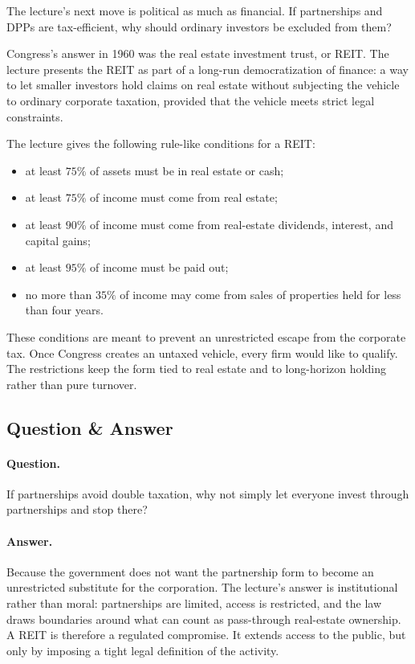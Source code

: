 The lecture's next move is political as much as financial. If partnerships and DPPs are tax-efficient, why should ordinary investors be excluded from them?

Congress's answer in 1960 was the real estate investment trust, or REIT. The lecture presents the REIT as part of a long-run democratization of finance: a way to let smaller investors hold claims on real estate without subjecting the vehicle to ordinary corporate taxation, provided that the vehicle meets strict legal constraints.

The lecture gives the following rule-like conditions for a REIT:

\begin{itemize}
\item at least \(75\%\) of assets must be in real estate or cash;
\item at least \(75\%\) of income must come from real estate;
\item at least \(90\%\) of income must come from real-estate dividends, interest, and capital gains;
\item at least \(95\%\) of income must be paid out;
\item no more than \(35\%\) of income may come from sales of properties held for less than four years.
\end{itemize}

These conditions are meant to prevent an unrestricted escape from the corporate tax. Once Congress creates an untaxed vehicle, every firm would like to qualify. The restrictions keep the form tied to real estate and to long-horizon holding rather than pure turnover.

\subsection{Question \& Answer}

\paragraph{Question.} If partnerships avoid double taxation, why not simply let everyone invest through partnerships and stop there?

\paragraph{Answer.} Because the government does not want the partnership form to become an unrestricted substitute for the corporation. The lecture's answer is institutional rather than moral: partnerships are limited, access is restricted, and the law draws boundaries around what can count as pass-through real-estate ownership. A REIT is therefore a regulated compromise. It extends access to the public, but only by imposing a tight legal definition of the activity.

